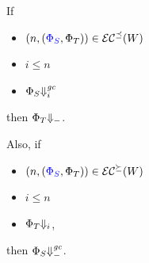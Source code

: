 \documentclass[a4paper]{article}
\begin{document}
\begin{lemma}
  If
  \begin{itemize}
  \item $\npair{\stpair{\Phi}{\Phi}}\in\lrec[\preceq](W)$
  \item $i \leq n$
  \item $\Phi_S \sterm[i]{\gc}$
  \end{itemize}
  then $\Phi_T\term$.

  Also, if
  \begin{itemize}
  \item $\npair{\stpair{\Phi}{\Phi}}\in\lrec[\succeq](W)$
  \item $i \leq n$
  \item $\Phi_T \term[i]$,
  \end{itemize}
  then $\Phi_S\sterm{\gc}$.
\end{lemma}
\end{document}
